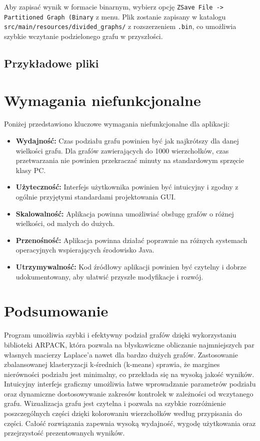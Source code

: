 \documentclass{article}
\begin{document}
    Aby zapisać wynik w formacie binarnym, wybierz opcję \texttt{ZSave File -> Partitioned Graph (Binary} z menu. Plik zostanie zapisany w katalogu \texttt{src/main/resources/divided\_graphs/} z rozszerzeniem \texttt{.bin}, co umożliwia szybkie wczytanie podzielonego grafu w przyszłości.
    
    \subsection{Przykładowe pliki}
    


\section{Wymagania niefunkcjonalne}

    Poniżej przedstawiono kluczowe wymagania niefunkcjonalne dla aplikacji:
    
    \begin{itemize}
        \item \textbf{Wydajność:} Czas podziału grafu powinien być jak najkrótszy dla danej wielkości grafu. Dla grafów zawierających do 1000 wierzchołków, czas przetwarzania nie powinien przekraczać minuty na standardowym sprzęcie klasy PC.
        \item \textbf{Użyteczność:} Interfejs użytkownika powinien być intuicyjny i zgodny z ogólnie przyjętymi standardami projektowania GUI.
        \item \textbf{Skalowalność:} Aplikacja powinna umożliwiać obsługę grafów o różnej wielkości, od małych do dużych.
        \item \textbf{Przenośność:} Aplikacja powinna działać poprawnie na różnych systemach operacyjnych wspierających środowisko Java.
        \item \textbf{Utrzymywalność:} Kod źródłowy aplikacji powinien być czytelny i dobrze udokumentowany, aby ułatwić przyszłe modyfikacje i rozwój.
    \end{itemize}



\section{Podsumowanie}

    Program umożliwia szybki i efektywny podział grafów dzięki wykorzystaniu biblioteki ARPACK, która pozwala na błyskawiczne obliczanie najmniejszych par własnych macierzy Laplace'a nawet dla bardzo dużych grafów. Zastosowanie zbalansowanej klasteryzacji k-średnich (k-means) sprawia, że margines nierówności podziału jest minimalny, co przekłada się na wysoką jakość wyników. Intuicyjny interfejs graficzny umożliwia łatwe wprowadzanie parametrów podziału oraz dynamiczne dostosowywanie zakresów kontrolek w zależności od wczytanego grafu. Wizualizacja grafu jest czytelna i pozwala na szybkie rozróżnienie poszczególnych części dzięki kolorowaniu wierzchołków według przypisania do części. Całość rozwiązania zapewnia wysoką wydajność, wygodę użytkowania oraz przejrzystość prezentowanych wyników.
\end{document}
